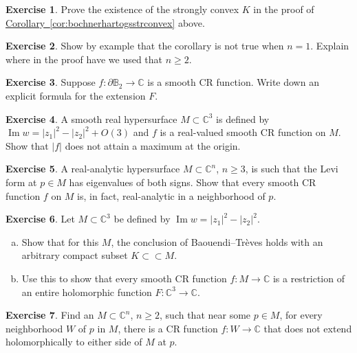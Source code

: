 \documentclass[12pt,openany]{book}
\renewcommand{\Im}{\operatorname{Im}}
\newcommand{\sabs}[1]{\lvert {#1} \rvert}
\newcommand{\C}{{\mathbb{C}}}
\newcommand{\bB}{{\mathbb{B}}}
\theoremstyle{plain}
\theoremstyle{remark}
\theoremstyle{definition}
\newenvironment{exbox}{%
    \def\FrameCommand{\vrule width 1pt \relax\hspace{10pt}}%
    \MakeFramed {\advance \hsize -\width \FrameRestore}%
}{%
    \endMakeFramed
}
\newenvironment{exparts}{%
    \leavevmode\begin{enumerate}[a),noitemsep,topsep=0pt,parsep=0pt,partopsep=0pt]
}{%
    \end{enumerate}
}
\theoremstyle{exercise}
\newtheorem{exercise}{Exercise}[section]
\theoremstyle{example}
\newcommand{\corref}[1]{\hyperref[#1]{Corollary~\ref*{#1}}}
\begin{document}
\begin{exbox}
\begin{exercise}
Prove the existence of the strongly convex $K$ in the proof of
\corref{cor:bochnerhartogsstrconvex} above.
\end{exercise}

\begin{exercise}
Show by example that the corollary is not true when $n=1$.  Explain where in
the proof have we used that $n \geq 2$.
\end{exercise}

\begin{exercise}
Suppose $f \colon \partial \bB_2 \to \C$ is a smooth CR function.
Write down an explicit formula for the extension $F$.
\end{exercise}

\begin{exercise}
A smooth real hypersurface $M \subset \C^3$ is defined by $\Im w = \sabs{z_1}^2-\sabs{z_2}^2 + O(3)$
and $f$ is a real-valued smooth CR function on $M$.  Show
that $\sabs{f}$ does not attain a maximum at the origin.
\end{exercise}

\begin{exercise}
A real-analytic hypersurface
$M \subset \C^n$, $n \geq 3$, is
such that the Levi form at $p \in M$ has eigenvalues of both signs.
Show that every smooth CR function $f$ on $M$ is, in fact, real-analytic in
a neighborhood of $p$.
\end{exercise}

\begin{exercise}
\pagebreak[2]
Let $M \subset \C^3$ be defined by $\Im w = \sabs{z_1}^2-\sabs{z_2}^2$.
\begin{exparts}
\item
Show that for this $M$,
the conclusion of Baouendi--Tr{\`e}ves holds with
an arbitrary compact subset $K \subset \subset M$.
\item
Use this to show that every
smooth CR function $f \colon M \to \C$ is a restriction of an entire holomorphic function
$F \colon \C^3 \to \C$.
\end{exparts}
\end{exercise}

\begin{exercise}
Find an $M \subset \C^n$, $n \geq 2$, such that near some $p \in M$,
for every neighborhood $W$ of $p$ in $M$, there is a CR function $f \colon
W \to \C$ that does not extend holomorphically to either side of $M$ at $p$.
\end{exercise}


\end{exbox}
\end{document}
